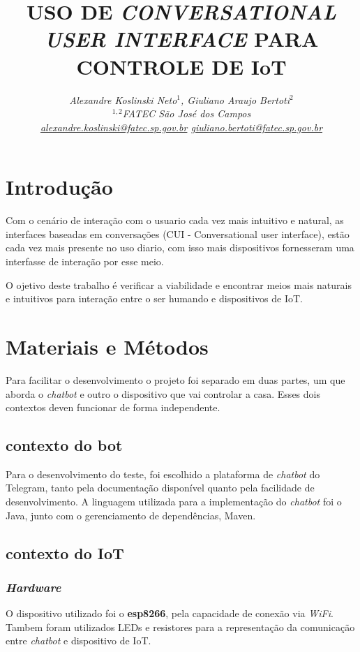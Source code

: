 \documentclass[10pt,a4paper,twocolumn]{article}
\title{\LARGE \bf
USO DE \textit{CONVERSATIONAL USER INTERFACE} PARA CONTROLE DE IoT
}
\author{\it
Alexandre Koslinski Neto$^{1}$, 
Giuliano Araujo Bertoti$^{2}$\\
$^{1,2}$FATEC São José dos Campos\\
\href{mailto:alexandre.koslinski@fatec.sp.gov.br}{alexandre.koslinski@fatec.sp.gov.br}
\href{mailto: giuliano.bertoti@fatec.sp.gov.br}{ giuliano.bertoti@fatec.sp.gov.br}
}
\begin{document}
 \vspace{-8ex}
  \date{}
\maketitle

\section{\bf Introdução}

Com o cenário de interação com o usuario cada vez mais intuitivo e natural, as interfaces baseadas em conversações (CUI - Conversational user interface), estão cada vez mais presente no uso diario, com isso mais dispositivos fornesseram uma interfasse de interação por esse meio.

O ojetivo deste trabalho é verificar a viabilidade e encontrar meios mais naturais e intuitivos para interação entre o ser humando e dispositivos de IoT.

\section{\bf Materiais e Métodos}

Para facilitar o desenvolvimento o projeto foi separado em duas partes, um que aborda o \textit{chatbot} e outro o dispositivo que vai controlar a casa.
Esses dois contextos deven funcionar de forma independente.
\subsection{contexto do bot}
Para o desenvolvimento do teste, foi escolhido a plataforma de \textit{chatbot} do Telegram, tanto pela documentação disponível quanto pela facilidade de desenvolvimento. A linguagem utilizada para a implementação do \textit{chatbot} foi o Java, junto com o gerenciamento de dependências, Maven.

\subsection{contexto do IoT}
\subsubsection{\textit{Hardware}}
O dispositivo utilizado foi o \textbf{esp8266}\cite{esp}, pela capacidade de conexão via \textit{WiFi}. Tambem foram utilizados LEDs e resistores para a representação da comunicação entre \textit{chatbot} e dispositivo de IoT.
\end{document}

